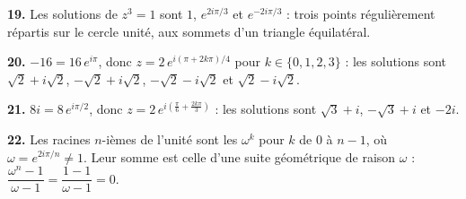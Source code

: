 \begin{corrige}
\textbf{19.} Les solutions de $z^{3} = 1$ sont $1$, $e^{2i\pi/3}$ et
$e^{-2i\pi/3}$ : trois points régulièrement répartis sur le cercle unité, aux
sommets d'un triangle équilatéral.

\textbf{20.} $-16 = 16\,e^{i\pi}$, donc $z = 2\,e^{i(\pi+2k\pi)/4}$ pour
$k \in \{0,1,2,3\}$ : les solutions sont $\sqrt2+i\sqrt2$,
$-\sqrt2+i\sqrt2$, $-\sqrt2-i\sqrt2$ et $\sqrt2-i\sqrt2$.

\textbf{21.} $8i = 8\,e^{i\pi/2}$, donc
$z = 2\,e^{i\left(\frac{\pi}{6}+\frac{2k\pi}{3}\right)}$ : les solutions sont
$\sqrt3+i$, $-\sqrt3+i$ et $-2i$.

\textbf{22.} Les racines $n$-ièmes de l'unité sont les $\omega^{k}$ pour
$k$ de $0$ à $n-1$, où $\omega = e^{2i\pi/n} \neq 1$. Leur somme est celle
d'une suite géométrique de raison $\omega$ :
$\dfrac{\omega^{n}-1}{\omega-1} = \dfrac{1-1}{\omega-1} = 0$.
\end{corrige}

